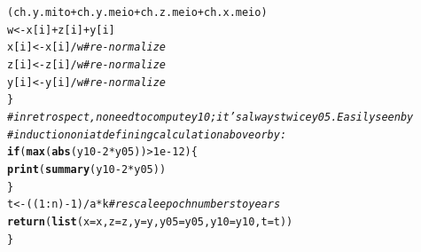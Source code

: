 \documentclass{article}\usepackage[]{graphicx}\usepackage[]{color}
\makeatletter
\newcommand{\hlnum}[1]{\textcolor[rgb]{0.686,0.059,0.569}{#1}}%
\newcommand{\hlcom}[1]{\textcolor[rgb]{0.678,0.584,0.686}{\textit{#1}}}%
\newcommand{\hlopt}[1]{\textcolor[rgb]{0,0,0}{#1}}%
\newcommand{\hlstd}[1]{\textcolor[rgb]{0.345,0.345,0.345}{#1}}%
\newcommand{\hlkwa}[1]{\textcolor[rgb]{0.161,0.373,0.58}{\textbf{#1}}}%
\newcommand{\hlkwb}[1]{\textcolor[rgb]{0.69,0.353,0.396}{#1}}%
\newcommand{\hlkwc}[1]{\textcolor[rgb]{0.333,0.667,0.333}{#1}}%
\newcommand{\hlkwd}[1]{\textcolor[rgb]{0.737,0.353,0.396}{\textbf{#1}}}%
\newenvironment{kframe}{%
 \def\at@end@of@kframe{}%
 \ifinner\ifhmode%
  \def\at@end@of@kframe{\end{minipage}}%
  \begin{minipage}{\columnwidth}%
 \fi\fi%
 \def\FrameCommand##1{\hskip\@totalleftmargin \hskip-\fboxsep
 \colorbox{shadecolor}{##1}\hskip-\fboxsep
     \hskip-\linewidth \hskip-\@totalleftmargin \hskip\columnwidth}%
 \MakeFramed {\advance\hsize-\width
   \@totalleftmargin\z@ \linewidth\hsize
   \@setminipage}}%
 {\par\unskip\endMakeFramed%
 \at@end@of@kframe}
\newenvironment{knitrout}{}{} %
\makeatother
\begin{document}
\begin{knitrout}
\begin{kframe}
\begin{alltt}
              \hlstd{( ch.y.mito} \hlopt{+} \hlstd{ch.y.meio}             \hlopt{+}  \hlstd{ch.z.meio} \hlopt{+} \hlstd{ch.x.meio       )}
    \hlstd{w} \hlkwb{<-} \hlstd{x[i]}\hlopt{+}\hlstd{z[i]}\hlopt{+}\hlstd{y[i]}
    \hlstd{x[i]} \hlkwb{<-} \hlstd{x[i]}\hlopt{/}\hlstd{w}    \hlcom{# re-normalize}
    \hlstd{z[i]} \hlkwb{<-} \hlstd{z[i]}\hlopt{/}\hlstd{w}    \hlcom{# re-normalize}
    \hlstd{y[i]} \hlkwb{<-} \hlstd{y[i]}\hlopt{/}\hlstd{w}    \hlcom{# re-normalize}
  \hlstd{\}}
  \hlcom{# in retrospect, no need to compute y10; it's always twice y05.  Easily seen by}
  \hlcom{# induction on i at defining calculation above or by:}
  \hlkwa{if}\hlstd{(}\hlkwd{max}\hlstd{(}\hlkwd{abs}\hlstd{(y10} \hlopt{-} \hlnum{2}\hlopt{*}\hlstd{y05))}\hlopt{>}\hlnum{1e-12}\hlstd{)\{}
    \hlkwd{print}\hlstd{(}\hlkwd{summary}\hlstd{(y10}\hlopt{-}\hlnum{2}\hlopt{*}\hlstd{y05))}
  \hlstd{\}}
  \hlstd{t} \hlkwb{<-} \hlstd{((}\hlnum{1}\hlopt{:}\hlstd{n)}\hlopt{-}\hlnum{1}\hlstd{)}\hlopt{/}\hlstd{a}\hlopt{*}\hlstd{k}  \hlcom{# rescale epoch numbers to years}
  \hlkwd{return}\hlstd{(}\hlkwd{list}\hlstd{(}\hlkwc{x}\hlstd{=x,} \hlkwc{z}\hlstd{=z,} \hlkwc{y}\hlstd{=y,} \hlkwc{y05}\hlstd{=y05,} \hlkwc{y10}\hlstd{=y10,} \hlkwc{t}\hlstd{=t))}
\hlstd{\}}
\end{alltt}
\end{kframe}
\end{knitrout}
\end{document}
